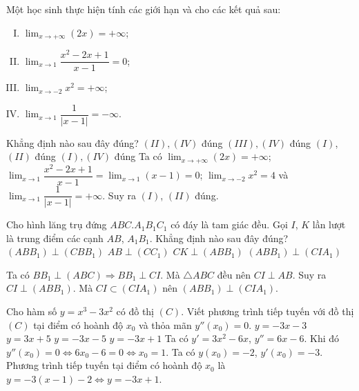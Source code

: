 \begin{ex}%
 Một học sinh thực hiện tính các giới hạn và cho các kết quả sau:
 \begin{enumerate}[(I)]
\item $\displaystyle\lim_{x\to +\infty}(2x)=+\infty$;
\item $\displaystyle\lim_{x\to 1}\dfrac{x^2-2x+1}{x-1}=0$;
\item $\displaystyle\lim_{x\to -2}x^2=+\infty$;
\item $\displaystyle\lim_{x\to 1}\dfrac{1}{|x-1|}=-\infty$.
\end{enumerate}
Khẳng định nào sau đây đúng?
\choice
{$(II), (IV)$ đúng}
{$(III), (IV)$ đúng}
{\True $(I)$, $(II)$ đúng}
{$(I), (IV)$ đúng}
\loigiai
{Ta có $\displaystyle\lim_{x\to +\infty}(2x)=+\infty$; $\displaystyle\lim_{x\to 1}\dfrac{x^2-2x+1}{x-1}=\displaystyle\lim_{x\to 1}(x-1)=0$; $\displaystyle\lim_{x\to -2}x^2=4$ và $\displaystyle\lim_{x\to 1}\dfrac{1}{|x-1|}=+\infty$. Suy ra $(I)$, $(II)$ đúng.
}
\end{ex}


\begin{ex}%
 Cho hình lăng trụ đứng $ABC.A_1B_1C_1$ có đáy là tam giác đều. Gọi $I$, $K$ lần lượt là trung điểm các cạnh $AB$, $A_1B_1$.
Khẳng định nào sau đây đúng?
\choice
{$(ABB_1)\perp (CBB_1)$}
{$AB\perp (CC_1)$}
{$CK\perp (ABB_1)$}
{\True $(ABB_1)\perp (CIA_1)$}
\loigiai
{
\immini
{Ta có $BB_1\perp (ABC)\Rightarrow BB_1\perp CI$. Mà $\triangle ABC$ đều nên $CI\perp AB$. Suy ra $CI\perp (ABB_1)$. Mà $CI\subset (CIA_1)$ nên $(ABB_1)\perp (CIA_1)$.
}
{
}
}
\end{ex}


\begin{ex}%
 Cho hàm số $y=x^3-3x^2$ có đồ thị $(C)$. Viết phương trình tiếp tuyến với đồ thị $(C)$ tại điểm có hoành độ $x_0$ và thỏa mãn $y''(x_0)=0$.
\choice
{$y=-3x-3$}
{$y=3x+5$}
{$y=-3x-5$}
{\True $y=-3x+1$}
\loigiai
{Ta có $y'=3x^2-6x$, $y''=6x-6$. Khi đó $y''(x_0)=0\Leftrightarrow 6x_0-6=0\Leftrightarrow x_0=1$. Ta có $y(x_0)=-2$, $y'(x_0)=-3$. Phương trình tiếp tuyến tại điểm có hoành độ $x_0$ là $y=-3(x-1)-2\Leftrightarrow y=-3x+1$.
}
\end{ex}


